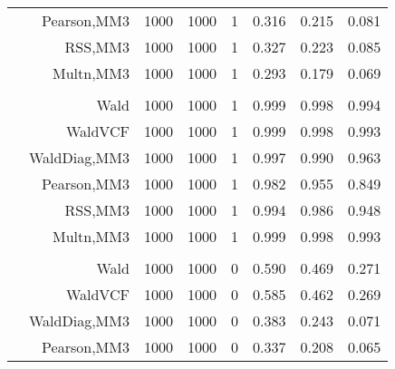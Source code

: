 \documentclass[
]{article}
\begin{document}
\begin{table}[H]
{\begin{tabular}[t]{lrrrrrrr}
\hspace{1em} & Pearson,MM3 & 1000 & 1000 & 1 & 0.316 & 0.215 & 0.081\\

\hspace{1em} & RSS,MM3 & 1000 & 1000 & 1 & 0.327 & 0.223 & 0.085\\

\hspace{1em} & Multn,MM3 & 1000 & 1000 & 1 & 0.293 & 0.179 & 0.069\\
\cmidrule{1-8}
\addlinespace[0.3em]
\multicolumn{8}{l}{\textbf{1F 15V}}\\
\hspace{1em} & Wald & 1000 & 1000 & 1 & 0.999 & 0.998 & 0.994\\

\hspace{1em} & WaldVCF & 1000 & 1000 & 1 & 0.999 & 0.998 & 0.993\\

\hspace{1em} & WaldDiag,MM3 & 1000 & 1000 & 1 & 0.997 & 0.990 & 0.963\\

\hspace{1em} & Pearson,MM3 & 1000 & 1000 & 1 & 0.982 & 0.955 & 0.849\\

\hspace{1em} & RSS,MM3 & 1000 & 1000 & 1 & 0.994 & 0.986 & 0.948\\

\hspace{1em} & Multn,MM3 & 1000 & 1000 & 1 & 0.999 & 0.998 & 0.993\\
\cmidrule{1-8}
\addlinespace[0.3em]
\multicolumn{8}{l}{\textbf{2F 10V}}\\
\hspace{1em} & Wald & 1000 & 1000 & 0 & 0.590 & 0.469 & 0.271\\

\hspace{1em} & WaldVCF & 1000 & 1000 & 0 & 0.585 & 0.462 & 0.269\\

\hspace{1em} & WaldDiag,MM3 & 1000 & 1000 & 0 & 0.383 & 0.243 & 0.071\\

\hspace{1em} & Pearson,MM3 & 1000 & 1000 & 0 & 0.337 & 0.208 & 0.065\\


\end{tabular}}
\end{table}
\end{document}
